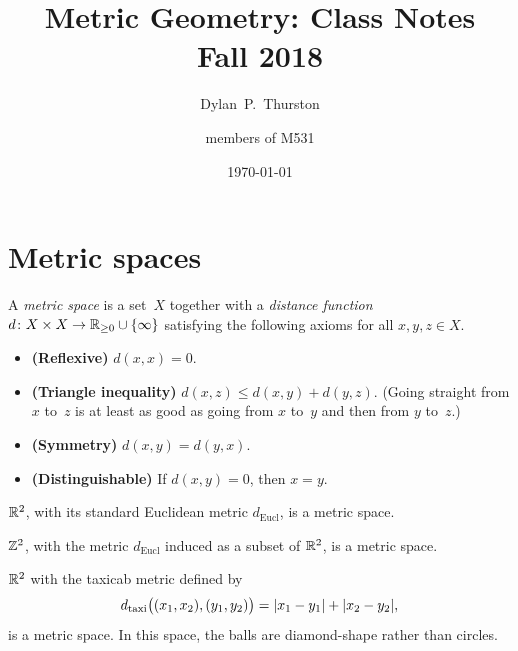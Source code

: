 \documentclass[12pt]{amsart}
\begin{document}
\title[Metric Geometry: Class Notes]{Metric Geometry: Class Notes\\
  \small Fall 2018}

\author[Thurston]{Dylan~P.~Thurston}
\author{members of M531}
\date{\today}

\maketitle

\tableofcontents

\section{Metric spaces}
\label{sec:metric-spaces}

\begin{definition}
  A \emph{metric space} is a set~$X$ together with a \emph{distance
    function} $d \colon X \times X \to \RR_{\ge 0} \cup \{\infty\}$
  satisfying the following axioms for all $x,y,z \in X$.
  \begin{itemize}
  \item \textbf{(Reflexive)} $d(x,x) = 0$.
  \item \textbf{(Triangle inequality)} $d(x,z) \le d(x,y) + d(y,z)$.
    (Going straight from $x$ to~$z$ is at least as good as going from
    $x$ to~$y$ and then from $y$ to~$z$.)
  \item \textbf{(Symmetry)} $d(x,y) = d(y,x)$.
  \item \textbf{(Distinguishable)} If $d(x,y) = 0$, then $x = y$.
  \end{itemize}
\end{definition}

\begin{example}
  $\mathbb R^2$, with its standard Euclidean metric $d_{\text{Eucl}}$, is a
  metric space.
\end{example}

\begin{example}
  $\mathbb Z^2$, with the metric $d_{\text{Eucl}}$ induced as a subset of
  $\mathbb R^2$, is a metric space.
\end{example}

\begin{example}
  $\mathbb R^2$ with the taxicab metric defined by
  \[
    d_{\text{taxi}}\bigl((x_1,x_2),(y_1,y_2)\bigr) = \lvert x_1 - y_1\rvert +
    \lvert x_2 - y_2\rvert,
  \]
  is a metric space. In this space, the balls are diamond-shape rather
  than circles.
\end{example}
\end{document}
